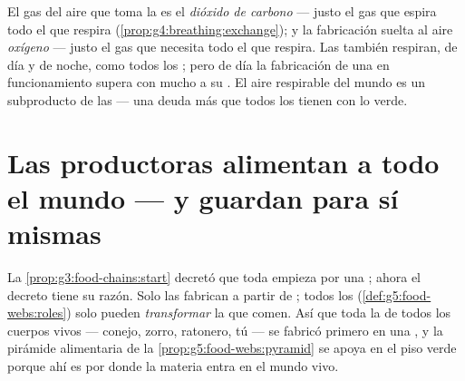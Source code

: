 \begin{remark}\label{rem:g6:plants-are-producers:gas}
El gas del aire que toma la  es el \emph{dióxido de carbono} ---
justo el gas que espira todo el que respira
(\cref{prop:g4:breathing:exchange}); y la fabricación suelta al aire
\emph{oxígeno} --- justo el gas que necesita todo el que respira. Las
 también respiran, de día y de noche, como todos los ; pero de día la fabricación de una  en funcionamiento supera
con mucho a su . El aire respirable del mundo es un
subproducto de las  --- una deuda más que todos los 
tienen con lo verde.
\end{remark}

\section{Las productoras alimentan a todo el mundo --- y guardan para sí mismas}

\begin{proposition}\label{prop:g6:plants-are-producers:firstlink}
La \cref{prop:g3:food-chains:start} decretó que toda  empieza por una ; ahora el decreto tiene su razón.
Solo las  fabrican  a partir de ; todos los  (\cref{def:g5:food-webs:roles}) solo
pueden \emph{transformar} la  que comen. Así que toda
la  de todos los cuerpos vivos --- conejo, zorro,
ratonero, tú --- se fabricó primero en una , y la pirámide
alimentaria de la \cref{prop:g5:food-webs:pyramid} se apoya en el piso
verde porque ahí es por donde la materia entra en el mundo vivo.
\end{proposition}
\admitted

